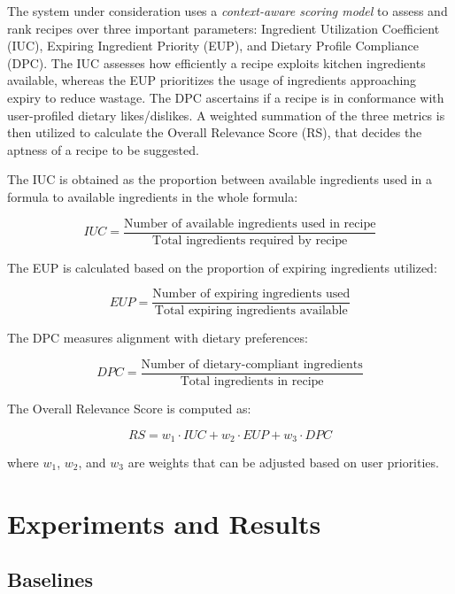 \documentclass[conference]{IEEEtran}
\begin{document}
The system under consideration uses a \textit{context-aware scoring model} to assess and rank recipes over three important parameters: Ingredient Utilization Coefficient (IUC), Expiring Ingredient Priority (EUP), and Dietary Profile Compliance (DPC). The IUC assesses how efficiently a recipe exploits kitchen ingredients available, whereas the EUP prioritizes the usage of ingredients approaching expiry to reduce wastage. The DPC ascertains if a recipe is in conformance with user-profiled dietary likes/dislikes. A weighted summation of the three metrics is then utilized to calculate the Overall Relevance Score (RS), that decides the aptness of a recipe to be suggested.

The IUC is obtained as the proportion between available ingredients used in a formula to available ingredients in the whole formula:

\begin{equation}
IUC = \frac{\text{Number of available ingredients used in recipe}}{\text{Total ingredients required by recipe}}
\end{equation}

The EUP is calculated based on the proportion of expiring ingredients utilized:

\begin{equation}
EUP = \frac{\text{Number of expiring ingredients used}}{\text{Total expiring ingredients available}}
\end{equation}

The DPC measures alignment with dietary preferences:

\begin{equation}
DPC = \frac{\text{Number of dietary-compliant ingredients}}{\text{Total ingredients in recipe}}
\end{equation}

The Overall Relevance Score is computed as:

\begin{equation}
RS = w_1 \cdot IUC + w_2 \cdot EUP + w_3 \cdot DPC
\end{equation}

where $w_1$, $w_2$, and $w_3$ are weights that can be adjusted based on user priorities.

\section{Experiments and Results}

\subsection{Baselines}
\end{document}
